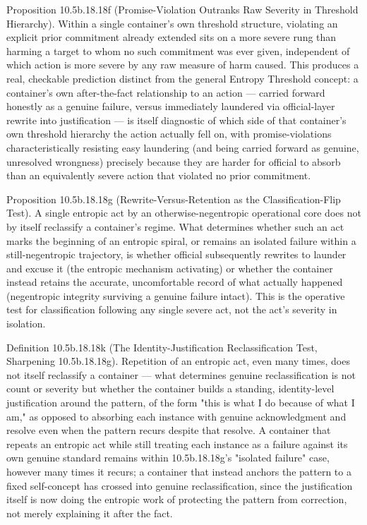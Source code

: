 \documentclass[
]{article}
\begin{document}
Proposition 10.5b.18.18f (Promise-Violation Outranks Raw Severity in
Threshold Hierarchy). Within a single container's own threshold
structure, violating an explicit prior commitment already extended sits
on a more severe rung than harming a target to whom no such commitment
was ever given, independent of which action is more severe by any raw
measure of harm caused. This produces a real, checkable prediction
distinct from the general Entropy Threshold concept: a container's own
after-the-fact relationship to an action --- carried forward honestly as
a genuine failure, versus immediately laundered via official-layer
rewrite into justification --- is itself diagnostic of which side of
that container's own threshold hierarchy the action actually fell on,
with promise-violations characteristically resisting easy laundering
(and being carried forward as genuine, unresolved wrongness) precisely
because they are harder for official to absorb than an equivalently
severe action that violated no prior commitment.

Proposition 10.5b.18.18g (Rewrite-Versus-Retention as the
Classification-Flip Test). A single entropic act by an
otherwise-negentropic operational core does not by itself reclassify a
container's regime. What determines whether such an act marks the
beginning of an entropic spiral, or remains an isolated failure within a
still-negentropic trajectory, is whether official subsequently rewrites
to launder and excuse it (the entropic mechanism activating) or whether
the container instead retains the accurate, uncomfortable record of what
actually happened (negentropic integrity surviving a genuine failure
intact). This is the operative test for classification following any
single severe act, not the act's severity in isolation.

Definition 10.5b.18.18k (The Identity-Justification Reclassification
Test, Sharpening 10.5b.18.18g). Repetition of an entropic act, even many
times, does not itself reclassify a container --- what determines
genuine reclassification is not count or severity but whether the
container builds a standing, identity-level justification around the
pattern, of the form "this is what I do because of what I am," as
opposed to absorbing each instance with genuine acknowledgment and
resolve even when the pattern recurs despite that resolve. A container
that repeats an entropic act while still treating each instance as a
failure against its own genuine standard remains within 10.5b.18.18g's
"isolated failure" case, however many times it recurs; a container that
instead anchors the pattern to a fixed self-concept has crossed into
genuine reclassification, since the justification itself is now doing
the entropic work of protecting the pattern from correction, not merely
explaining it after the fact.
\end{document}
